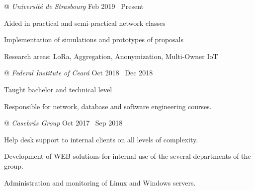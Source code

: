 \newlength{\lcolwidth}
\setlength{\lcolwidth}{.8\textwidth}
\newlength{\rcolwidth}
\setlength{\rcolwidth}{\dimexpr(\textwidth - \lcolwidth)\relax}





 @ \textit{Université de Strasbourg} \dotfill \enspace Feb 2019 \textemdash\  Present
\begin{minipage}[t]{\lcolwidth}
\raggedright
{\small \begin{zitemize}
  \item Aided in practical and semi-practical network classes
  \item Implementation of simulations and prototypes of proposals
  \item Research areas: LoRa, Aggregation, Anonymization, Multi-Owner IoT
\end{zitemize}}
\end{minipage}%
\begin{minipage}[t]{\rcolwidth}
\raggedleft
{}
\end{minipage}
\enskip




 @ \textit{Federal Institute of Ceará} \dotfill \enspace Oct 2018 \textemdash\  Dec 2018
\begin{minipage}[t]{\lcolwidth}
\raggedright
{\small \begin{zitemize}
  \item Taught bachelor and technical level

  \item Responsible for network, database and software engineering courses.
\end{zitemize}}
\end{minipage}%
\begin{minipage}[t]{\rcolwidth}
\raggedleft
{}
\end{minipage}
\enskip


 @ \textit{Casebrás Group} \dotfill \enspace Oct 2017 \textemdash\  Sep 2018
\begin{minipage}[t]{\lcolwidth}
\raggedright
{\small \begin{zitemize}
  \item Help desk support to internal clients on all levels of complexity.

  \item Development of WEB solutions for internal use of the several departments of the group.

  \item Administration and monitoring of Linux and Windows servers.
\end{zitemize}}
\end{minipage}%
\begin{minipage}[t]{\rcolwidth}
\raggedleft
{}
\end{minipage}
\enskip




